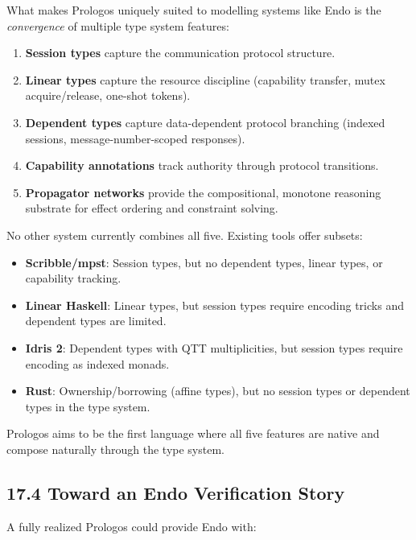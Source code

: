\documentclass[11pt]{article}
\begin{document}
What makes Prologos uniquely suited to modelling systems like Endo is the
\emph{convergence} of multiple type system features:

\begin{enumerate}
\item \textbf{Session types} capture the communication protocol structure.
\item \textbf{Linear types} capture the resource discipline (capability transfer,
mutex acquire/release, one-shot tokens).
\item \textbf{Dependent types} capture data-dependent protocol branching (indexed
sessions, message-number-scoped responses).
\item \textbf{Capability annotations} track authority through protocol transitions.
\item \textbf{Propagator networks} provide the compositional, monotone reasoning
substrate for effect ordering and constraint solving.
\end{enumerate}

No other system currently combines all five. Existing tools offer subsets:

\begin{itemize}
\item \textbf{Scribble/mpst}: Session types, but no dependent types, linear types, or
capability tracking.
\item \textbf{Linear Haskell}: Linear types, but session types require encoding tricks
and dependent types are limited.
\item \textbf{Idris 2}: Dependent types with QTT multiplicities, but session types
require encoding as indexed monads.
\item \textbf{Rust}: Ownership/borrowing (affine types), but no session types or
dependent types in the type system.
\end{itemize}

Prologos aims to be the first language where all five features are native
and compose naturally through the type system.
\subsection{17.4 Toward an Endo Verification Story}
\label{sec:org134e18e}

A fully realized Prologos could provide Endo with:
\end{document}
